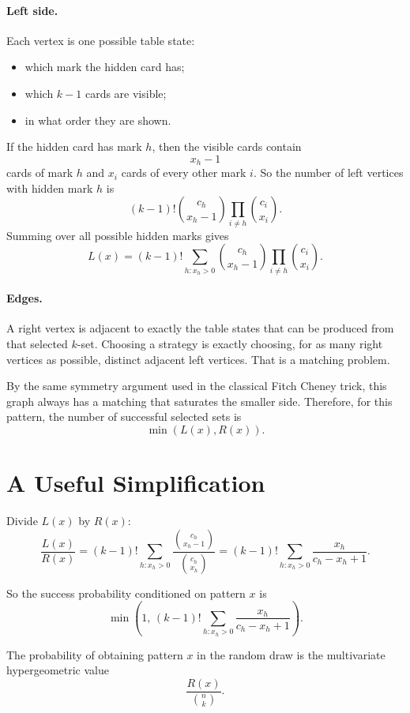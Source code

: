 \documentclass[11pt]{article}
\begin{document}
\paragraph{Left side.}
Each vertex is one possible table state:
\begin{itemize}[leftmargin=*]
    \item which mark the hidden card has;
    \item which $k-1$ cards are visible;
    \item in what order they are shown.
\end{itemize}

If the hidden card has mark $h$, then the visible cards contain
\[
    x_h - 1
\]
cards of mark $h$ and $x_i$ cards of every other mark $i$. So the number of left vertices with hidden
mark $h$ is
\[
    (k-1)! \binom{c_h}{x_h - 1} \prod_{i \ne h} \binom{c_i}{x_i}.
\]
Summing over all possible hidden marks gives
\[
    L(x) = (k-1)! \sum_{h : x_h > 0}
    \binom{c_h}{x_h - 1} \prod_{i \ne h} \binom{c_i}{x_i}.
\]

\paragraph{Edges.}
A right vertex is adjacent to exactly the table states that can be produced from that selected $k$-set.
Choosing a strategy is exactly choosing, for as many right vertices as possible, distinct adjacent left
vertices. That is a matching problem.

By the same symmetry argument used in the classical Fitch Cheney trick, this graph always has a matching
that saturates the smaller side. Therefore, for this pattern, the number of successful selected sets is
\[
    \min(L(x), R(x)).
\]

\section*{A Useful Simplification}

Divide $L(x)$ by $R(x)$:
\[
    \frac{L(x)}{R(x)}
    = (k-1)! \sum_{h : x_h > 0}
    \frac{\binom{c_h}{x_h - 1}}{\binom{c_h}{x_h}}
    = (k-1)! \sum_{h : x_h > 0}
    \frac{x_h}{c_h - x_h + 1}.
\]

So the success probability conditioned on pattern $x$ is
\[
    \min\!\left(1,\,
    (k-1)! \sum_{h : x_h > 0}
    \frac{x_h}{c_h - x_h + 1}\right).
\]

The probability of obtaining pattern $x$ in the random draw is the multivariate hypergeometric value
\[
    \frac{R(x)}{\binom{n}{k}}.
\]
\end{document}
